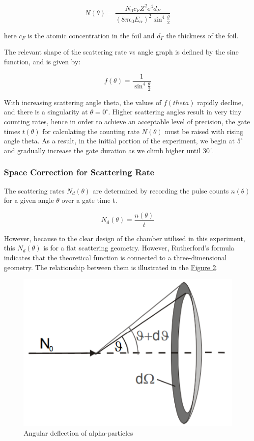 		\begin{equation}
			\label{eq:1}
			N(\theta) = \frac{N_0c_FZ^2e^4d_F}{(8\pi\epsilon_0E_\alpha)^2\sin^4\frac{\theta}{2}}
		\end{equation}

		here $c_F$ is the atomic concentration in the foil and $d_F$ the thickness of the foil.

		The relevant shape of the scattering rate vs  angle graph is defined by the sine function, and is given by:

		$$f(\theta) = \frac{1}{\sin^4\frac{\theta}{2}}$$

		With increasing scattering angle theta, the values of $f(theta)$ rapidly decline, and there is a singularity at $\theta=0^\circ$. Higher scattering angles result in very tiny counting rates, hence in order to achieve an acceptable level of precision, the gate times $t(\theta)$ for calculating the counting rate $N(\theta)$ must be raised with rising angle theta. As a result, in the initial portion of the experiment, we begin at $5^\circ$ and gradually increase the gate duration as we climb higher until $30^\circ$.

		\subsubsection{Space Correction for Scattering Rate}

			The scattering rates $N_d(\theta)$ are determined by recording the pulse counts $n(\theta)$ for a given angle $\theta$ over a gate time t.

			$$N_d(\theta) = \frac{n(\theta)}{t}$$

			However, because to the clear design of the chamber utilised in this experiment, this $N_d(\theta)$ is for a flat scattering geometry. However, Rutherford's formula indicates that the theoretical function is connected to a three-dimensional geometry. The relationship between them is illustrated in the \hyperref[fig:2]{Figure 2}.

			\begin{figure}[h]
				\centering
				\includegraphics[width=0.8\columnwidth]{images/theory2.png}
				\caption{Angular deflection of alpha-particles}
				\label{fig:2}
			\end{figure}

